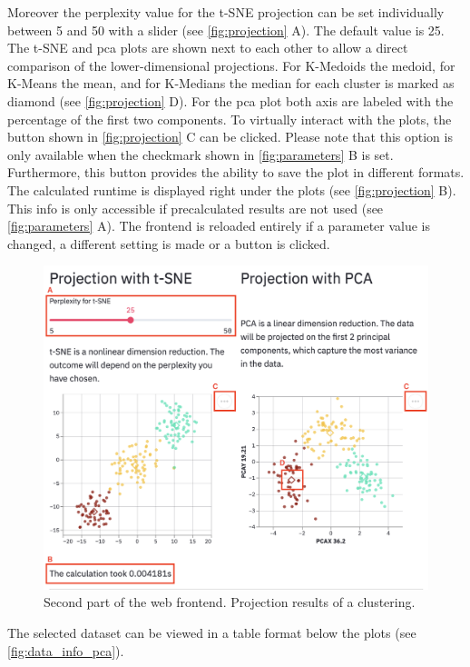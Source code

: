 Moreover the perplexity value for the t-SNE projection can be set individually between 5 and 50 with a slider (see \autoref{fig:projection} A). The default value is 25. The \acrshort{t-SNE} and \acrshort{pca} plots are shown next to each other to allow a direct comparison of the lower-dimensional projections. For K-Medoids the medoid, for K-Means the mean, and for K-Medians the median for each cluster is marked as diamond (see \autoref{fig:projection} D). For the \acrshort{pca} plot both axis are labeled with the percentage of the first two components. To virtually interact with the plots, the button shown in \autoref{fig:projection} C can be clicked. Please note that this option is only available when the checkmark shown in \autoref{fig:parameters} B is set. Furthermore, this button provides the ability to save the plot in different formats.
The calculated runtime is displayed right under the plots (see \autoref{fig:projection} B). This info is only accessible if precalculated results are not used (see \autoref{fig:parameters} A).
The frontend is reloaded entirely if a parameter value is changed, a different setting is made or a button is clicked. 
\begin{figure}[H]
	\centering
	\includegraphics[width=\linewidth]{modules/web_frontend/projection_letters}
	\caption{Second part of the web frontend. Projection results of a clustering.}\label{fig:projection}
\end{figure}

The selected dataset can be viewed in a table format below the plots (see \autoref{fig:data_info_pca}).

